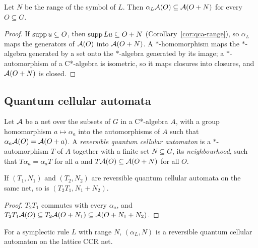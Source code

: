 \begin{theorem}[Locality]\label{thm:alpha-local}
Let $N$ be the range of the symbol of $L$. Then $\alpha_L\mathcal A(O)\subseteq\mathcal A(O+N)$ for every $O\subseteq G$.
\end{theorem}

\begin{proof}
If $\operatorname{supp} u\subseteq O$, then $\operatorname{supp} Lu\subseteq O+N$ (Corollary~\ref{cor:qca-range}), so $\alpha_L$ maps
the generators of $\mathcal A(O)$ into $\mathcal A(O+N)$. A $*$-homomorphism maps the $*$-algebra generated by a set
onto the $*$-algebra generated by its image; a $*$-automorphism of a C*-algebra is isometric, so it
maps closures into closures, and $\mathcal A(O+N)$ is closed.
\end{proof}

\subsection{Quantum cellular automata}

\begin{definition}\label{def:rqca}
Let $\mathcal A$ be a net over the subsets of $G$ in a C*-algebra $A$, with a group homomorphism
$a\mapsto\alpha_a$ into the automorphisms of $A$ such that $\alpha_a\mathcal A(O)=\mathcal A(O+a)$. A \emph{reversible quantum cellular automaton} is a
$*$-automorphism $T$ of $A$ together with a finite set $N\subseteq G$, its \emph{neighbourhood}, such
that $T\alpha_a=\alpha_aT$ for all $a$ and $T\mathcal A(O)\subseteq\mathcal A(O+N)$ for all $O$.
\end{definition}

\noindent{}

\begin{proposition}[Composition]\label{prop:rqca-comp}
If $(T_1,N_1)$ and $(T_2,N_2)$ are reversible quantum cellular automata on the same net, so is
$(T_2T_1,N_1+N_2)$.
\end{proposition}

\begin{proof}
$T_2T_1$ commutes with every $\alpha_a$, and $T_2T_1\mathcal A(O)\subseteq T_2\mathcal A(O+N_1)\subseteq\mathcal A(O+N_1+N_2)$.
\end{proof}

\begin{theorem}\label{thm:rule-qca}
For a symplectic rule $L$ with range $N$, $(\alpha_L,N)$ is a reversible quantum cellular automaton
on the lattice CCR net.
\end{theorem}

